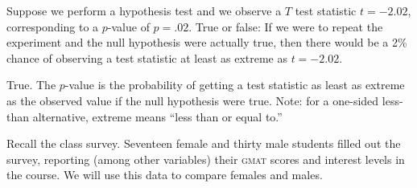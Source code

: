 \documentclass[11pt]{exam}
\begin{document}
\begin{questions}


\question Suppose we perform a hypothesis test and we observe a $T$ test statistic
$t = -2.02$, corresponding to a $p$-value of $p = .02$.  True or false: If we were
to repeat the experiment and the null
hypothesis were actually true, then there would be a 2\% chance of observing a
test statistic at least as extreme as $t = -2.02$.

\begin{solution}
True.  The $p$-value is the probability of getting a test statistic as least
as extreme as the observed value if the null hypothesis were true.
Note: for a one-sided less-than alternative, extreme means ``less than or equal to.''
\end{solution}




\newpage



\question \label{ques:confint-survey}
Recall the class survey.  Seventeen female and thirty male
students filled out the survey, reporting (among other variables) their
\textsc{gmat} scores and interest levels in the course.  We will use this data
to compare females and males.

\end{questions}
\end{document}
